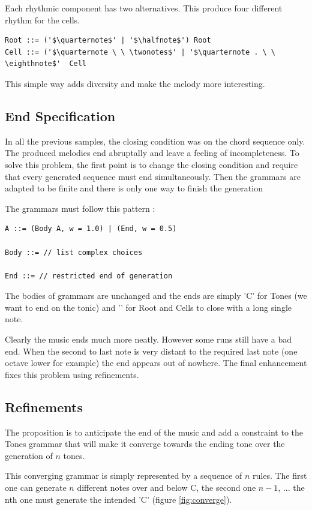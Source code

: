 \documentclass[twocolumn, 11pt]{article}
\begin{document}
Each rhythmic component has two alternatives. This produce four different rhythm for the cells.
\begin{lstlisting}
Root ::= ('$\quarternote$' | '$\halfnote$') Root
Cell ::= ('$\quarternote \ \ \twonotes$' | '$\quarternote . \ \ \eighthnote$'  Cell
\end{lstlisting}

This simple way adds diversity and make the melody more interesting.

\subsection{End Specification}

In all the previous samples, the closing condition was on the chord sequence only. The produced melodies end abruptally and leave a feeling of incompleteness.
To solve this problem, the first point is to change the closing condition and require that every generated sequence must end simultaneously.
Then the grammars are adapted to be finite and there is only one way to finish the generation

The grammars must follow this pattern :


\begin{lstlisting}
A ::= (Body A, w = 1.0) | (End, w = 0.5)

Body ::= // list complex choices

End ::= // restricted end of generation
\end{lstlisting}

The bodies of grammars are unchanged and the ends are simply 'C' for Tones (we want to end on the tonic) and '\halfnote' for Root and Cells to close with a long single note.

Clearly the music ends much more neatly. However some runs still have a bad end. When the second to last note is very distant to the required last note (one octave lower for example) the end appears out of nowhere. The final enhancement fixes this problem using refinements.

\subsection{Refinements}

The proposition is to anticipate the end of the music and add a constraint to the Tones grammar that will make it converge towards the ending tone over the generation of $n$ tones.

This converging grammar is simply represented by a sequence of $n$ rules. The first one can generate $n$ different notes over and below C, the second one $n-1$, ... the nth one must generate the intended 'C' (figure \ref{fig:converge}).
\end{document}
